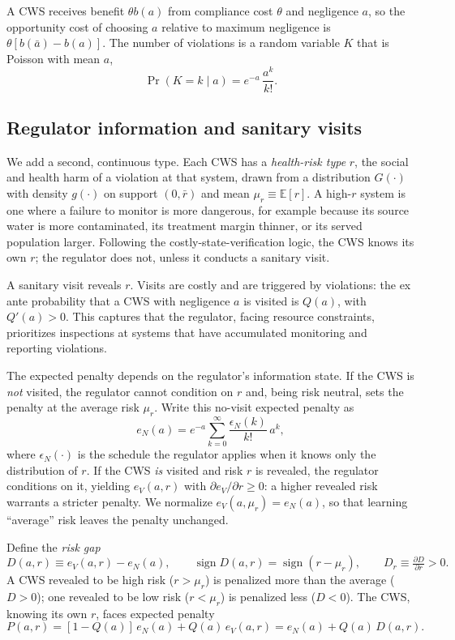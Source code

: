 A CWS receives benefit $\theta b(a)$ from compliance cost $\theta$ and negligence $a$, so the opportunity cost of choosing $a$ relative to maximum negligence is $\theta[b(\bar{a})-b(a)]$. The number of violations is a random variable $K$ that is Poisson with mean $a$,
\[
\Pr(K=k\mid a) = e^{-a}\,\frac{a^k}{k!}.
\]

\subsection{Regulator information and sanitary visits}

We add a second, continuous type. Each CWS has a \emph{health-risk type} $r$, the social and health harm of a violation at that system, drawn from a distribution $G(\cdot)$ with density $g(\cdot)$ on support $(0,\bar{r})$ and mean $\mu_r \equiv \mathbb{E}[r]$. A high-$r$ system is one where a failure to monitor is more dangerous, for example because its source water is more contaminated, its treatment margin thinner, or its served population larger. Following the costly-state-verification logic, the CWS knows its own $r$; the regulator does not, unless it conducts a sanitary visit.

A sanitary visit reveals $r$. Visits are costly and are triggered by violations: the ex ante probability that a CWS with negligence $a$ is visited is $Q(a)$, with $Q'(a)>0$. This captures that the regulator, facing resource constraints, prioritizes inspections at systems that have accumulated monitoring and reporting violations.

The expected penalty depends on the regulator's information state. If the CWS is \emph{not} visited, the regulator cannot condition on $r$ and, being risk neutral, sets the penalty at the average risk $\mu_r$. Write this no-visit expected penalty as
\[
e_N(a) = e^{-a}\sum_{k=0}^{\infty} \frac{\epsilon_N(k)}{k!}\,a^k ,
\]
where $\epsilon_N(\cdot)$ is the schedule the regulator applies when it knows only the distribution of $r$. If the CWS \emph{is} visited and risk $r$ is revealed, the regulator conditions on it, yielding $e_V(a,r)$ with $\partial e_V/\partial r \ge 0$: a higher revealed risk warrants a stricter penalty. We normalize $e_V(a,\mu_r) = e_N(a)$, so that learning ``average'' risk leaves the penalty unchanged.

Define the \emph{risk gap}
\[
D(a,r) \equiv e_V(a,r) - e_N(a), \qquad \operatorname{sign} D(a,r) = \operatorname{sign}(r-\mu_r), \qquad D_r \equiv \tfrac{\partial D}{\partial r} > 0 .
\]
A CWS revealed to be high risk ($r>\mu_r$) is penalized more than the average ($D>0$); one revealed to be low risk ($r<\mu_r$) is penalized less ($D<0$). The CWS, knowing its own $r$, faces expected penalty
\begin{equation}\label{eq:expected_penalty_visit}
P(a,r) = [1-Q(a)]\,e_N(a) + Q(a)\,e_V(a,r) = e_N(a) + Q(a)\,D(a,r).
\end{equation}

